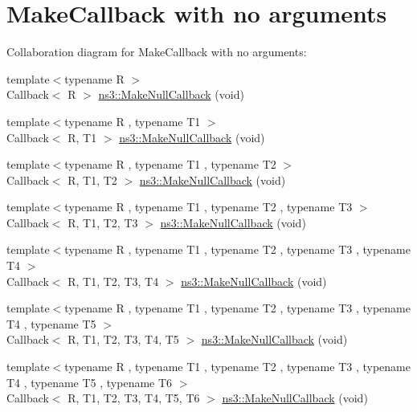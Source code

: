 \hypertarget{group__makenullcallback}{}\section{Make\+Callback with no arguments}
\label{group__makenullcallback}
Collaboration diagram for Make\+Callback with no arguments\+:
\begin{DoxyCompactItemize}
\item 
{\footnotesize template$<$typename R $>$ }\\Callback$<$ R $>$ \hyperlink{group__makenullcallback_ga7e3cd6816f63ea9112c04b0086c2c65a}{ns3\+::\+Make\+Null\+Callback} (void)
\item 
{\footnotesize template$<$typename R , typename T1 $>$ }\\Callback$<$ R, T1 $>$ \hyperlink{group__makenullcallback_gab4b59638d844a92474872bd33f319d18}{ns3\+::\+Make\+Null\+Callback} (void)
\item 
{\footnotesize template$<$typename R , typename T1 , typename T2 $>$ }\\Callback$<$ R, T1, T2 $>$ \hyperlink{group__makenullcallback_ga802803ba86d7d7aab29846ea82ef7c6f}{ns3\+::\+Make\+Null\+Callback} (void)
\item 
{\footnotesize template$<$typename R , typename T1 , typename T2 , typename T3 $>$ }\\Callback$<$ R, T1, T2, T3 $>$ \hyperlink{group__makenullcallback_ga1e046045dd3f6956e5935f1eace442d7}{ns3\+::\+Make\+Null\+Callback} (void)
\item 
{\footnotesize template$<$typename R , typename T1 , typename T2 , typename T3 , typename T4 $>$ }\\Callback$<$ R, T1, T2, T3, T4 $>$ \hyperlink{group__makenullcallback_ga93a541bfe054d0253803f4ab7a09042c}{ns3\+::\+Make\+Null\+Callback} (void)
\item 
{\footnotesize template$<$typename R , typename T1 , typename T2 , typename T3 , typename T4 , typename T5 $>$ }\\Callback$<$ R, T1, T2, T3, T4, T5 $>$ \hyperlink{group__makenullcallback_ga19c151ed07a6dbf5b29178129d0b8889}{ns3\+::\+Make\+Null\+Callback} (void)
\item 
{\footnotesize template$<$typename R , typename T1 , typename T2 , typename T3 , typename T4 , typename T5 , typename T6 $>$ }\\Callback$<$ R, T1, T2, T3, T4, T5, T6 $>$ \hyperlink{group__makenullcallback_ga0e38259d9c897b6335d1ff2d6bd963f4}{ns3\+::\+Make\+Null\+Callback} (void)

\end{DoxyCompactItemize}
